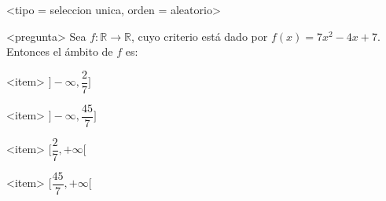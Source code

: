 <tipo = seleccion unica, orden = aleatorio>

<pregunta>
Sea $f:\mathbb R \to \mathbb R$, cuyo criterio est\'a dado por $f(x) = 7x^2 -4x +7$. Entonces el \'ambito de $f$ es:


<item>
$\bigg]{-}\infty, \dfrac{2}{7}\bigg]$

<item>
$\bigg]{-}\infty, \dfrac{45}{7}\bigg]$

<item>
$\bigg[\dfrac{2}{7}, +\infty\bigg[$

<item>
$\bigg[\dfrac{45}{7}, +\infty\bigg[$



